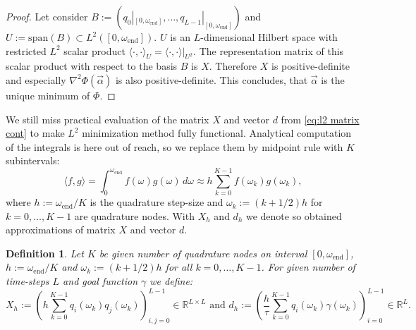 \documentclass[a4paper,11pt,bibliography=totoc,listof=totoc,headinclude=true,cleardoublepage=empty,oneside]{scrbook}
\newtheorem{definition}[theorem]{Definition}
\newcommand{\R}{\mathbb{R}}
\newcommand{\e}{\mathrm{end}}
\begin{document}
\begin{proof}
    Let consider $B:=\left(q_0|_{[0, \omega_\e]}, \dots, q_{L-1}|_{[0, \omega_\e]}\right)$ and $U := \mathrm{span}(B) \subset L^2\left([0, \omega_\e]\right)$. $U$ is an $L$-dimensional Hilbert space with restricted $L^2$ scalar product $\langle \cdot, \cdot \rangle_U = \langle \cdot , \cdot \rangle|_{U^2}$. The representation matrix of this scalar product with respect to the basis $B$ is $X$. Therefore $X$ is positive-definite and especially $\nabla^2\Phi(\Vec{\alpha})$ is also positive-definite. This concludes, that $\Vec{\alpha}$ is the unique minimum of $\Phi$. 
\end{proof}

We still miss practical evaluation of the matrix $X$ and vector $d$ from \eqref{eq:l2 matrix cont} to make $L^2$ minimization method fully functional. Analytical computation of the integrals is here out of reach, so we replace them by midpoint rule with $K$ subintervals:
\begin{equation*}
    \langle f, g \rangle = \int_0^{\omega_\e} f(\omega) g(\omega) \, d\omega \approx h \sum_{k=0}^{K-1} f(\omega_k)g(\omega_k), 
\end{equation*}
where $h := \omega_\e/K$ is the quadrature step-size and $\omega_k := (k+1/2)h$ for $k = 0, \dots, K-1$ are quadrature nodes. With $X_h$ and $d_h$ we denote so obtained approximations of matrix $X$ and vector $d$.

\begin{definition}\label{def:Xh}
    Let $K$ be given number of quadrature nodes on interval $[0, \omega_\e]$, $h := \omega_\e/K$ and $\omega_k := (k+1/2)h$ for all $k = 0, \dots, K-1$. For given number of time-steps $L$ and goal function $\gamma$ we define:
    \begin{equation*}
        X_h := \left(h\sum_{k=0}^{K-1} q_i(\omega_k)q_j(\omega_k)\right)_{i,j = 0}^{L-1} \in \R^{L\times L} \text{ and } d_h := \left(\frac{h}{\tau}\sum_{k=0}^{K-1} q_i(\omega_k)\gamma(\omega_k) \right)_{i=0}^{L-1} \in \R^L.
    \end{equation*}
\end{definition}
\end{document}
